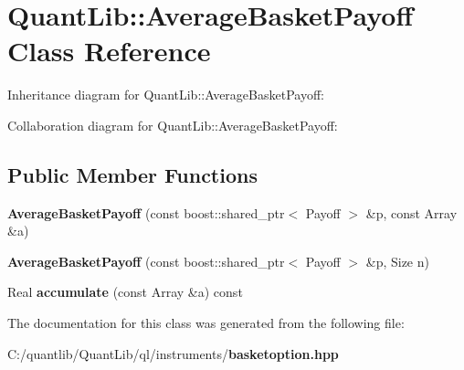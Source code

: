 \section{Quant\+Lib\+:\+:Average\+Basket\+Payoff Class Reference}
\label{class_quant_lib_1_1_average_basket_payoff}


Inheritance diagram for Quant\+Lib\+:\+:Average\+Basket\+Payoff\+:


Collaboration diagram for Quant\+Lib\+:\+:Average\+Basket\+Payoff\+:
\subsection*{Public Member Functions}
\begin{DoxyCompactItemize}
\item 
{\bfseries Average\+Basket\+Payoff} (const boost\+::shared\+\_\+ptr$<$ Payoff $>$ \&p, const Array \&a)\label{class_quant_lib_1_1_average_basket_payoff_a4a885c95605dd855dd067fa8556c42e0}

\item 
{\bfseries Average\+Basket\+Payoff} (const boost\+::shared\+\_\+ptr$<$ Payoff $>$ \&p, Size n)\label{class_quant_lib_1_1_average_basket_payoff_acb74ec7e3c4e593d2f0ba73d12f56a05}

\item 
Real {\bfseries accumulate} (const Array \&a) const \label{class_quant_lib_1_1_average_basket_payoff_aa6a74eb25ede434db3814a9b0221a044}

\end{DoxyCompactItemize}


The documentation for this class was generated from the following file\+:\begin{DoxyCompactItemize}
\item 
C\+:/quantlib/\+Quant\+Lib/ql/instruments/{\bf basketoption.\+hpp}\end{DoxyCompactItemize}

